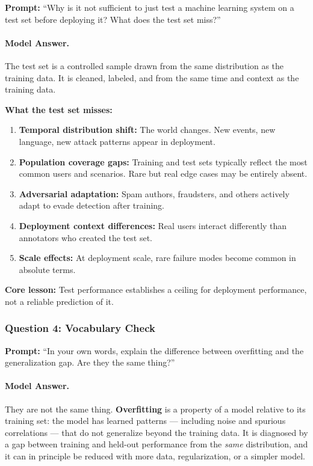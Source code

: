 \textbf{Prompt:} ``Why is it not sufficient to just test a machine learning system on a test set before deploying it? What does the test set miss?''

\paragraph{Model Answer.}

The test set is a controlled sample drawn from the same distribution as the training data. It is cleaned, labeled, and from the same time and context as the training data.

\textbf{What the test set misses:}
\begin{enumerate}
    \item \textbf{Temporal distribution shift:} The world changes. New events, new language, new attack patterns appear in deployment.
    \item \textbf{Population coverage gaps:} Training and test sets typically reflect the most common users and scenarios. Rare but real edge cases may be entirely absent.
    \item \textbf{Adversarial adaptation:} Spam authors, fraudsters, and others actively adapt to evade detection after training.
    \item \textbf{Deployment context differences:} Real users interact differently than annotators who created the test set.
    \item \textbf{Scale effects:} At deployment scale, rare failure modes become common in absolute terms.
\end{enumerate}

\textbf{Core lesson:} Test performance establishes a ceiling for deployment performance, not a reliable prediction of it.

\subsubsection{Question 4: Vocabulary Check}

\textbf{Prompt:} ``In your own words, explain the difference between overfitting and the generalization gap. Are they the same thing?''

\paragraph{Model Answer.}

They are not the same thing. \textbf{Overfitting} is a property of a model relative to its training set: the model has learned patterns --- including noise and spurious correlations --- that do not generalize beyond the training data. It is diagnosed by a gap between training and held-out performance from the \emph{same} distribution, and it can in principle be reduced with more data, regularization, or a simpler model.

